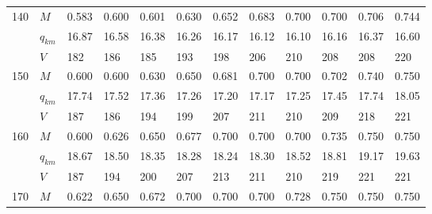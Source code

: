 \documentclass[bachelor,subf,14pt, substylefile = spbu.rtx]{disser}
\begin{document}
\begin{table}
{\begin{tabular}{|l|l|llllllllll|}
\hline
140 & $M$ &  0.583  &                   0.600  &                   0.601  &                   0.630  &                   0.652  &                   0.683  &  0.700 \cellcolor{green} &                   0.700  &  0.706  &  0.744  \\
& $q_{km}$ &  16.87  &                   16.58  &                   16.38  &                   16.26  &                   16.17  &                   16.12  &  16.10 \cellcolor{green} &                   16.16  &  16.37  &  16.60  \\
& $V$ &    182  &                     186  &                     185  &                     193  &                     198  &                     206  &    210 \cellcolor{green} &                     208  &    208  &    220  \\
\hline
150 & $M$ &  0.600  &                   0.600  &                   0.630  &                   0.650  &                   0.681  &  0.700 \cellcolor{green} &                   0.700  &                   0.702  &  0.740  &  0.750  \\
& $q_{km}$ &  17.74  &                   17.52  &                   17.36  &                   17.26  &                   17.20  &  17.17 \cellcolor{green} &                   17.25  &                   17.45  &  17.74  &  18.05  \\
& $V$ &    187  &                     186  &                     194  &                     199  &                     207  &    211 \cellcolor{green} &                     210  &                     209  &    218  &    221  \\
\hline
160 & $M$ &  0.600  &                   0.626  &                   0.650  &                   0.677  &  0.700 \cellcolor{green} &                   0.700  &                   0.700  &                   0.735  &  0.750  &  0.750  \\
& $q_{km}$ &  18.67  &                   18.50  &                   18.35  &                   18.28  &  18.24 \cellcolor{green} &                   18.30  &                   18.52  &                   18.81  &  19.17  &  19.63  \\
& $V$ &    187  &                     194  &                     200  &                     207  &    213 \cellcolor{green} &                     211  &                     210  &                     219  &    221  &    221  \\
\hline
170 & $M$ &  0.622  &                   0.650  &                   0.672  &  0.700 \cellcolor{green} &                   0.700  &                   0.700  &                   0.728  &                   0.750  &  0.750  &  0.750  \\

\end{tabular}}
\end{table}
\end{document}
